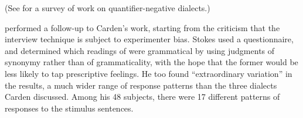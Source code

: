  (See \citet{Labov1972a} for a survey of work on quantifier-negative dialects.)



\citet{Stokes1974} performed  a  follow-up  to  Carden's  work,  starting  from the criticism that the interview technique is subject to experimenter bias. Stokes used a questionnaire, and determined which readings of  were grammatical by using judgments of synonymy rath\-er than of grammaticality, with the hope that the former would be less likely to tap prescriptive feelings. He too found ``extraordinary variation'' in the results, a much wider range of response patterns  than  the  three  dialects  Carden  discussed.  Among his 48 subjects, there were 17 different patterns of responses to the stimulus sentences.

